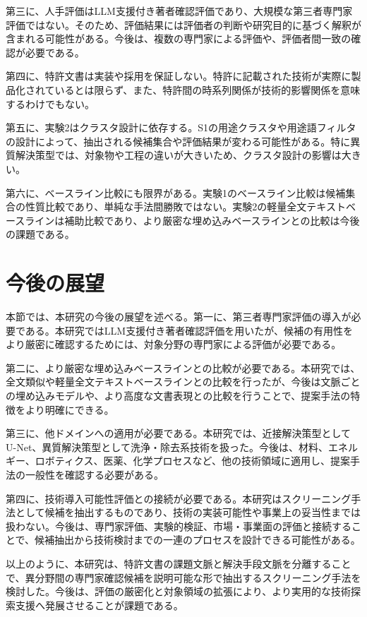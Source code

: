 第三に、人手評価はLLM支援付き著者確認評価であり、大規模な第三者専門家評価ではない。そのため、評価結果には評価者の判断や研究目的に基づく解釈が含まれる可能性がある。今後は、複数の専門家による評価や、評価者間一致の確認が必要である。

第四に、特許文書は実装や採用を保証しない。特許に記載された技術が実際に製品化されているとは限らず、また、特許間の時系列関係が技術的影響関係を意味するわけでもない。

第五に、実験2はクラスタ設計に依存する。S1の用途クラスタや用途語フィルタの設計によって、抽出される候補集合や評価結果が変わる可能性がある。特に異質解決策型では、対象物や工程の違いが大きいため、クラスタ設計の影響は大きい。

第六に、ベースライン比較にも限界がある。実験1のベースライン比較は候補集合の性質比較であり、単純な手法間勝敗ではない。実験2の軽量全文テキストベースラインは補助比較であり、より厳密な埋め込みベースラインとの比較は今後の課題である。

\section{今後の展望}

本節では、本研究の今後の展望を述べる。第一に、第三者専門家評価の導入が必要である。本研究ではLLM支援付き著者確認評価を用いたが、候補の有用性をより厳密に確認するためには、対象分野の専門家による評価が必要である。

第二に、より厳密な埋め込みベースラインとの比較が必要である。本研究では、全文類似や軽量全文テキストベースラインとの比較を行ったが、今後は文脈ごとの埋め込みモデルや、より高度な文書表現との比較を行うことで、提案手法の特徴をより明確にできる。

第三に、他ドメインへの適用が必要である。本研究では、近接解決策型としてU-Net、異質解決策型として洗浄・除去系技術を扱った。今後は、材料、エネルギー、ロボティクス、医薬、化学プロセスなど、他の技術領域に適用し、提案手法の一般性を確認する必要がある。

第四に、技術導入可能性評価との接続が必要である。本研究はスクリーニング手法として候補を抽出するものであり、技術の実装可能性や事業上の妥当性までは扱わない。今後は、専門家評価、実験的検証、市場・事業面の評価と接続することで、候補抽出から技術検討までの一連のプロセスを設計できる可能性がある。

以上のように、本研究は、特許文書の課題文脈と解決手段文脈を分離することで、異分野間の専門家確認候補を説明可能な形で抽出するスクリーニング手法を検討した。今後は、評価の厳密化と対象領域の拡張により、より実用的な技術探索支援へ発展させることが課題である。
